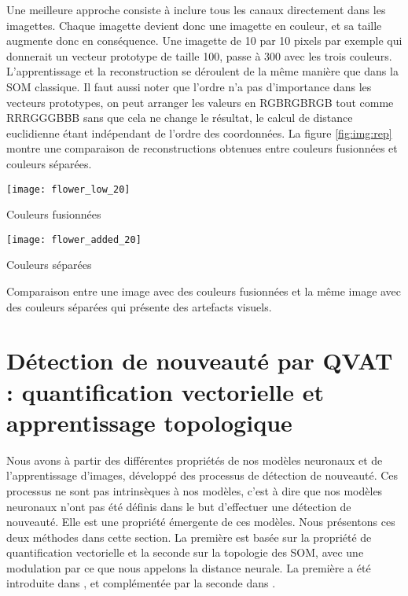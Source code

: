 	Une meilleure approche consiste à inclure tous les canaux directement dans les imagettes. Chaque imagette devient donc une imagette en couleur, et sa taille augmente donc en conséquence. Une imagette de 10 par 10 pixels par exemple qui donnerait un vecteur prototype de taille 100, passe à 300 avec les trois couleurs. L'apprentissage et la reconstruction se déroulent de la même manière que dans la SOM classique. Il faut aussi noter que l'ordre n'a pas d'importance dans les vecteurs prototypes, on peut arranger les valeurs en RGBRGBRGB tout comme RRRGGGBBB sans que cela ne change le résultat, le calcul de distance euclidienne étant indépendant de l'ordre des coordonnées. La figure \ref{fig:img:rep} montre une comparaison de reconstructions obtenues entre couleurs fusionnées et couleurs séparées.

	\begin{figureth}
		\begin{subfigureth}{0.48\textwidth}
			\texttt{[image: flower\_low\_20]}\caption{Couleurs fusionnées}	
		\end{subfigureth}
		\begin{subfigureth}{0.48\textwidth}
			\texttt{[image: flower\_added\_20]}\caption{Couleurs séparées}	
		\end{subfigureth}
		\caption[Représentation d'une image]{Comparaison entre une image avec des couleurs fusionnées et la même image avec des couleurs séparées qui présente des artefacts visuels.\footnotemark}\label{fig:img:rep}
	\end{figureth}


	\newpage
	\section{Détection de nouveauté par QVAT : quantification vectorielle et apprentissage topologique}

	Nous avons à partir des différentes propriétés de nos modèles neuronaux et de l'apprentissage d'images, développé des processus de détection de nouveauté. Ces processus ne sont pas intrinsèques à nos modèles, c'est à dire que nos modèles neuronaux n'ont pas été définis dans le but d'effectuer une détection de nouveauté. Elle est une propriété émergente de ces modèles. Nous présentons ces deux méthodes dans cette section. La première est basée sur la propriété de quantification vectorielle et la seconde sur la topologie des SOM, avec une modulation par ce que nous appelons la distance neurale. La première a été introduite dans \cite{bernard2019novelty}, et complémentée par la seconde dans \cite{bernard2020novelty}.

